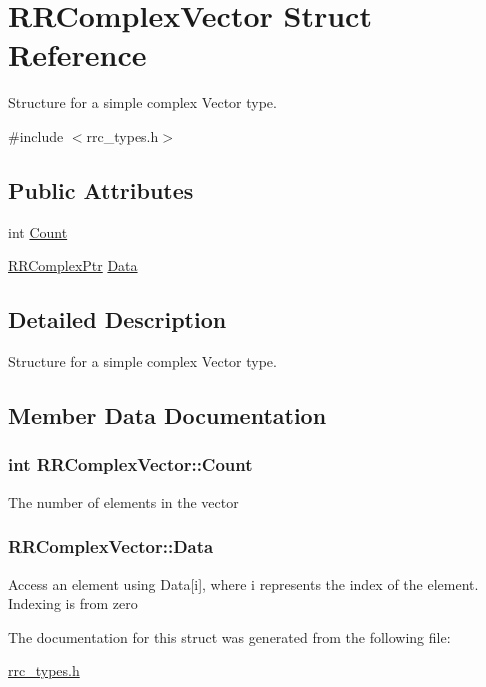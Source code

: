 \hypertarget{struct_r_r_complex_vector}{}\section{R\+R\+Complex\+Vector Struct Reference}
\label{struct_r_r_complex_vector}


Structure for a simple complex Vector type.  




{\ttfamily \#include $<$rrc\+\_\+types.\+h$>$}

\subsection*{Public Attributes}
\begin{DoxyCompactItemize}
\item 
int \hyperlink{struct_r_r_complex_vector_a930d0decc2af8858b710280850d14d97}{Count}
\item 
\hyperlink{rrc__types_8h_ada2046d7326c56ae29d8510fbf6622ee}{R\+R\+Complex\+Ptr} \hyperlink{struct_r_r_complex_vector_ab09f6755f3856b4d97e0d40a7a7c2a20}{Data}
\end{DoxyCompactItemize}


\subsection{Detailed Description}
Structure for a simple complex Vector type. 

\subsection{Member Data Documentation}
\hypertarget{struct_r_r_complex_vector_a930d0decc2af8858b710280850d14d97}{}
\subsubsection[{Count}]{\setlength{\rightskip}{0pt plus 5cm}int R\+R\+Complex\+Vector\+::\+Count}\label{struct_r_r_complex_vector_a930d0decc2af8858b710280850d14d97}
The number of elements in the vector \hypertarget{struct_r_r_complex_vector_ab09f6755f3856b4d97e0d40a7a7c2a20}{}
\subsubsection[{Data}]{ R\+R\+Complex\+Vector\+::\+Data}\label{struct_r_r_complex_vector_ab09f6755f3856b4d97e0d40a7a7c2a20}
Access an element using Data\mbox{[}i\mbox{]}, where i represents the index of the element. Indexing is from zero 

The documentation for this struct was generated from the following file\+:\begin{DoxyCompactItemize}
\item 
\hyperlink{rrc__types_8h}{rrc\+\_\+types.\+h}\end{DoxyCompactItemize}
